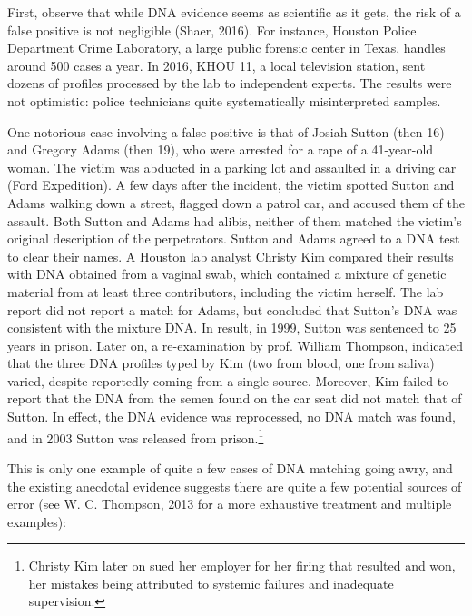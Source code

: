 \documentclass[
  10pt,
  dvipsnames,enabledeprecatedfontcommands]{scrartcl}
\newcommand{\raf}[1]{\todo[color=olive!40]{#1}}
\begin{document}
First, observe that while DNA evidence seems as scientific as it gets,
the risk of a false positive is not negligible (Shaer, 2016). For
instance, Houston Police Department Crime Laboratory, a large public
forensic center in Texas, handles around 500 cases a year. In 2016, KHOU
11, a local television station, sent dozens of profiles processed by the
lab to independent experts. The results were not optimistic: police
technicians quite systematically misinterpreted samples.

One notorious case involving a false positive is that of Josiah Sutton
(then 16) and Gregory Adams (then 19), who were arrested for a rape of a
41-year-old woman. The victim was abducted in a parking lot and
assaulted in a driving car (Ford Expedition). A few days after the
incident, the victim spotted Sutton and Adams walking down a street,
flagged down a patrol car, and accused them of the assault. Both Sutton
and Adams had alibis, neither of them matched the victim's original
description of the perpetrators. Sutton and Adams agreed to a DNA test
to clear their names. A Houston lab analyst Christy Kim compared their
results with DNA obtained from a vaginal swab, which contained a mixture
of genetic material from at least three contributors, including the
victim herself. The lab report did not report a match for Adams, but
concluded that Sutton's DNA was consistent with the mixture DNA. In
result, in 1999, Sutton was sentenced to 25 years in prison. Later on, a
re-examination by prof. William Thompson, indicated that the three DNA
profiles typed by Kim (two from blood, one from saliva) varied, despite
reportedly coming from a single source. Moreover, Kim failed to report
that the DNA from the semen found on the car seat did not match that of
Sutton. In effect, the DNA evidence was reprocessed, no DNA match was
found, and in 2003 Sutton was released from prison.\footnote{Christy Kim
  later on sued her employer for her firing that resulted and won, her
  mistakes being attributed to systemic failures and inadequate
  supervision.}

This is only one example of quite a few cases of DNA matching going
awry, and the existing anecdotal evidence suggests there are quite a few
potential sources of error (see W. C. Thompson, 2013 for a more
exhaustive treatment and multiple examples):

\raf{A: Bib references are missing here, is it on purpose?}
\end{document}
